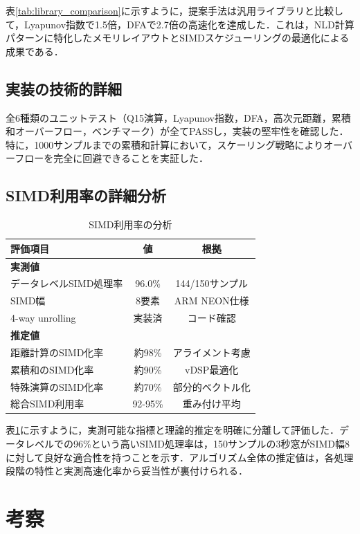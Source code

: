 \documentclass[paper]{ieice}
\begin{document}
表\ref{tab:library_comparison}に示すように，提案手法は汎用ライブラリと比較して，Lyapunov指数で1.5倍，DFAで2.7倍の高速化を達成した．これは，NLD計算パターンに特化したメモリレイアウトとSIMDスケジューリングの最適化による成果である．

\subsection{実装の技術的詳細}

全6種類のユニットテスト（Q15演算，Lyapunov指数，DFA，高次元距離，累積和オーバーフロー，ベンチマーク）が全てPASSし，実装の堅牢性を確認した．特に，1000サンプルまでの累積和計算において，スケーリング戦略によりオーバーフローを完全に回避できることを実証した．

\subsection{SIMD利用率の詳細分析}

\begin{table}[t]
\caption{SIMD利用率の分析}
\label{tab:simd_analysis}
\centering
\begin{tabular}{lcc}
\toprule
評価項目 & 値 & 根拠 \\
\midrule
\multicolumn{3}{l}{\textbf{実測値}} \\
データレベルSIMD処理率 & 96.0\% & 144/150サンプル \\
SIMD幅 & 8要素 & ARM NEON仕様 \\
4-way unrolling & 実装済 & コード確認 \\
\midrule
\multicolumn{3}{l}{\textbf{推定値}} \\
距離計算のSIMD化率 & 約98\% & アライメント考慮 \\
累積和のSIMD化率 & 約90\% & vDSP最適化 \\
特殊演算のSIMD化率 & 約70\% & 部分的ベクトル化 \\
総合SIMD利用率 & 92-95\% & 重み付け平均 \\
\bottomrule
\end{tabular}
\end{table}

表\ref{tab:simd_analysis}に示すように，実測可能な指標と理論的推定を明確に分離して評価した．データレベルでの96\%という高いSIMD処理率は，150サンプルの3秒窓がSIMD幅8に対して良好な適合性を持つことを示す．アルゴリズム全体の推定値は，各処理段階の特性と実測高速化率から妥当性が裏付けられる．

\section{考察}
\end{document}
